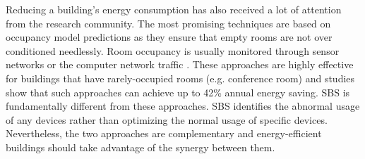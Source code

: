 Reducing a building's energy consumption has also received a lot of attention from the research community.
The most promising techniques are based on occupancy model predictions as they ensure that empty rooms are not over conditioned needlessly.
Room occupancy is usually monitored through sensor networks \cite{agarwal:ipsn2011,erickson:ipsn2011} or the computer network traffic \cite{kim:buildsys2010}.
These approaches are highly effective for buildings that have rarely-occupied rooms (e.g. conference room) and studies show that such approaches
 can achieve up to 42\% annual energy saving.
SBS is fundamentally different from these approaches.  SBS identifies the abnormal usage of any devices rather than optimizing the normal usage of specific devices.
Nevertheless, the two approaches are complementary and energy-efficient buildings should take advantage of the synergy between them.






% 
% 
% 
% 

% 
% 
% 
% 
% 
% 
% 
% 


